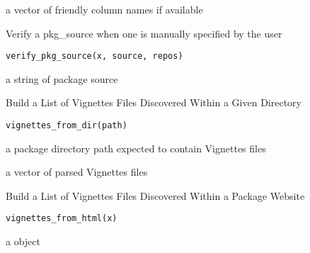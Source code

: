 \documentclass[a4paper]{book}
\begin{document}
%
\begin{Value}
a vector of friendly column names if available
\end{Value}
%
\begin{Description}
Verify a pkg\_source when one is manually specified by the user
\end{Description}
%
\begin{Usage}
\begin{verbatim}
verify_pkg_source(x, source, repos)
\end{verbatim}
\end{Usage}
%
\begin{Value}
a string of package source
\end{Value}
%
\begin{Description}
Build a List of Vignettes Files Discovered Within a Given Directory
\end{Description}
%
\begin{Usage}
\begin{verbatim}
vignettes_from_dir(path)
\end{verbatim}
\end{Usage}
%
\begin{Arguments}
\begin{ldescription}
\item[\code{path}] a package directory path expected to contain Vignettes files
\end{ldescription}
\end{Arguments}
%
\begin{Value}
a vector of parsed Vignettes files
\end{Value}
%
\begin{Description}
Build a List of Vignettes Files Discovered Within a Package Website
\end{Description}
%
\begin{Usage}
\begin{verbatim}
vignettes_from_html(x)
\end{verbatim}
\end{Usage}
%
\begin{Arguments}
\begin{ldescription}
\item[\code{x}] a  object
\end{ldescription}
\end{Arguments}
\end{document}
